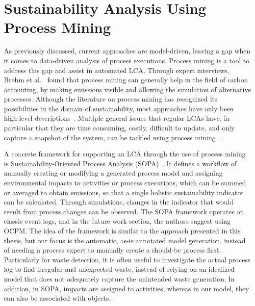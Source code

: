 \section{Sustainability Analysis Using Process Mining}



As previously discussed, current approaches are model-driven, leaving a gap when it comes to data-driven analysis of process executions.
Process mining is a tool to address this gap and assist in automated LCA.
Through expert interviews, Brehm et al.~\autocite{brehm2022} found that process mining can generally help in the field of carbon accounting, by making emissions visible and allowing the simulation of alternative processes.
Although the literature on process mining has recognized its possibilities in the domain of sustainability, most approaches have only been high-level descriptions~\autocite{fritsch2022}.
Multiple general issues that regular LCAs have, in particular that they are time consuming, costly, difficult to update, and only capture a snapshot of the system, can be tackled using process mining~\autocite{ortmeier2021}.




A concrete framework for supporting an LCA through the use of process mining is Sustainability-Oriented Process Analysis (SOPA)~\autocites{klessascheck2025, klessascheck2025-2}.
It defines a workflow of manually creating or modifying a generated process model and assigning environmental impacts to activities or process executions, which can be summed or averaged to obtain emissions, so that a single holistic sustainability indicator can be calculated.
Through simulations, changes in the indicator that would result from process changes can be observed.
The SOPA framework operates on classic event logs, and in the future work section, the authors suggest using OCPM.
The idea of the framework is similar to the approach presented in this thesis, but our focus is the automatic, as-is annotated model generation, instead of needing a process expert to manually create a should-be process first.
Particularly for waste detection, it is often useful to investigate the actual process log to find irregular and unexpected waste, instead of relying on an idealized model that does not adequately capture the unintended waste generation.
In addition, in SOPA, impacts are assigned to activities, whereas in our model, they can also be associated with objects.




